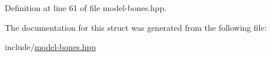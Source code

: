Definition at line 61 of file model-\/bones.\+hpp.



The documentation for this struct was generated from the following file\+:\begin{DoxyCompactItemize}
\item 
include/\hyperlink{model-bones_8hpp}{model-\/bones.\+hpp}\end{DoxyCompactItemize}
